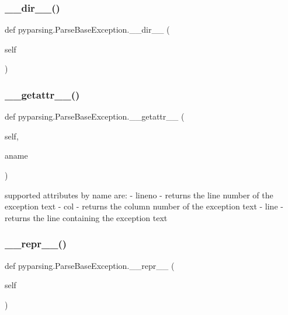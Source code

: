 \subsubsection{\texorpdfstring{\+\_\+\+\_\+dir\+\_\+\+\_\+()}{\_\_dir\_\_()}}
{\footnotesize\ttfamily def pyparsing.\+Parse\+Base\+Exception.\+\_\+\+\_\+dir\+\_\+\+\_\+ (\begin{DoxyParamCaption}\item[{}]{self }\end{DoxyParamCaption})}

\mbox{\label{classpyparsing_1_1ParseBaseException_a3672e3272d9f757078904736c8f8700c}} 
\subsubsection{\texorpdfstring{\+\_\+\+\_\+getattr\+\_\+\+\_\+()}{\_\_getattr\_\_()}}
{\footnotesize\ttfamily def pyparsing.\+Parse\+Base\+Exception.\+\_\+\+\_\+getattr\+\_\+\+\_\+ (\begin{DoxyParamCaption}\item[{}]{self,  }\item[{}]{aname }\end{DoxyParamCaption})}

\begin{DoxyVerb}supported attributes by name are:
   - lineno - returns the line number of the exception text
   - col - returns the column number of the exception text
   - line - returns the line containing the exception text
\end{DoxyVerb}
 \mbox{\label{classpyparsing_1_1ParseBaseException_a6af2baff63327588110825f3eabcbec4}} 
\subsubsection{\texorpdfstring{\+\_\+\+\_\+repr\+\_\+\+\_\+()}{\_\_repr\_\_()}}
{\footnotesize\ttfamily def pyparsing.\+Parse\+Base\+Exception.\+\_\+\+\_\+repr\+\_\+\+\_\+ (\begin{DoxyParamCaption}\item[{}]{self }\end{DoxyParamCaption})}

